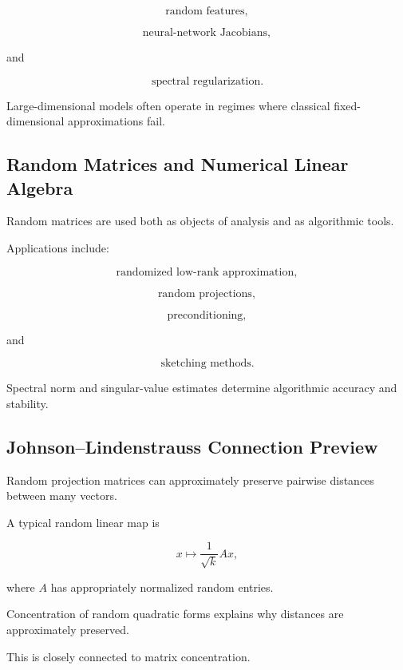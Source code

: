 \[
\boxed{
\text{random features},
}
\]

\[
\boxed{
\text{neural-network Jacobians},
}
\]

and

\[
\boxed{
\text{spectral regularization}.
}
\]

Large-dimensional models often operate in regimes where classical
fixed-dimensional approximations fail.

\subsection{Random Matrices and Numerical Linear Algebra}
\label{subsec:rmt-numerical-linear-algebra}

Random matrices are used both as objects of analysis and as algorithmic
tools.

Applications include:

\[
\boxed{
\text{randomized low-rank approximation},
}
\]

\[
\boxed{
\text{random projections},
}
\]

\[
\boxed{
\text{preconditioning},
}
\]

and

\[
\boxed{
\text{sketching methods}.
}
\]

Spectral norm and singular-value estimates determine algorithmic
accuracy and stability.

\subsection{Johnson--Lindenstrauss Connection Preview}
\label{subsec:jl-random-matrix-preview}

Random projection matrices can approximately preserve pairwise
distances between many vectors.

A typical random linear map is

\[
\boxed{
x
\mapsto
\frac1{\sqrt{k}}Ax,
}
\]

where \(A\) has appropriately normalized random entries.

Concentration of random quadratic forms explains why distances are
approximately preserved.

This is closely connected to matrix concentration.

